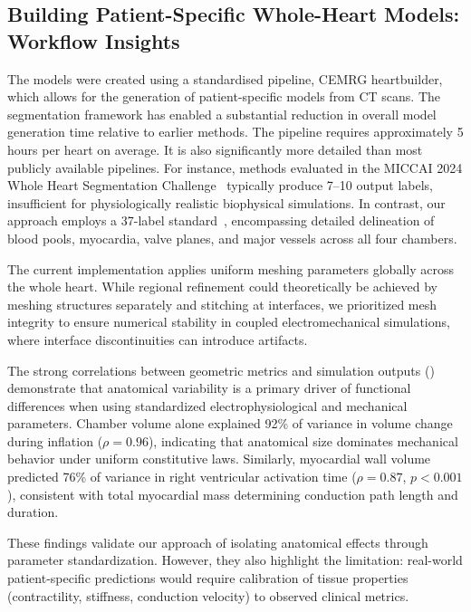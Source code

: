 \subsection{Building Patient-Specific Whole-Heart Models: Workflow Insights}
The models were created using a standardised pipeline, CEMRG heartbuilder, 
which allows for the generation of patient-specific models from CT scans. 
The segmentation framework has enabled a substantial reduction in overall model generation time relative to 
earlier methods. The pipeline requires approximately 5 hours per heart on average.
It is also significantly more detailed than most publicly available pipelines. 
For instance, methods evaluated in the MICCAI 2024 Whole Heart Segmentation Challenge~\cite{miccai2024_challenge} 
typically produce 7–10 output labels, insufficient for physiologically realistic biophysical simulations. 
In contrast, our approach employs a 37-label standard~\cite{strocchi2020_cohort,strocchi2020_simulating}, 
encompassing detailed delineation of blood pools, myocardia, valve planes,
and major vessels across all four chambers.

The current implementation applies uniform meshing parameters globally 
across the whole heart. While regional refinement could theoretically be 
achieved by meshing structures separately and stitching at interfaces, 
we prioritized mesh integrity to ensure numerical stability in coupled 
electromechanical simulations, where interface discontinuities can 
introduce artifacts.

The strong correlations between geometric metrics and simulation outputs 
() demonstrate that anatomical variability
is a primary driver of functional differences when using standardized 
electrophysiological and mechanical parameters. Chamber volume alone explained 
92\% of variance in volume change during inflation ($\rho = 0.96$), indicating 
that anatomical size dominates mechanical behavior under uniform constitutive 
laws. Similarly, myocardial wall volume predicted 76\% of variance in right 
ventricular activation time ($\rho = 0.87$, $p < 0.001$), consistent with 
total myocardial mass determining conduction path length and duration.

These findings validate our approach of isolating anatomical effects through 
parameter standardization. However, they also highlight the limitation: 
real-world patient-specific predictions would require calibration of tissue 
properties (contractility, stiffness, conduction velocity) to observed 
clinical metrics.

